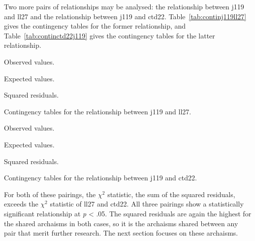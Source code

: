 Two more pairs of relationships may be analysed: the relationship between \gls{j119} and \gls{ll27} and the relationship between \gls{j119} and \gls{ctd22}. Table~\ref{tab:continj119ll27} gives the contingency tables for the former relationship, and Table~\ref{tab:continctd22j119} gives the contingency tables for the latter relationship. 
\begin{table}[h]
  \centering
  \begin{subtable}[b]{0.5\linewidth}
    \centering
    \caption{Observed values.}
    \label{stab:obsj119ll27}
  \end{subtable}%
  \begin{subtable}[b]{0.5\linewidth}
    \centering
    \caption{Expected values.}
    \label{stab:expj119ll27}
  \end{subtable}
  \begin{subtable}[b]{0.5\linewidth}
    \centering
    \caption{Squared residuals.}
    \label{stab:sqresj119ll27}
  \end{subtable}
  \caption{Contingency tables for the relationship between \acrshort{j119} and \acrshort{ll27}.}
  \label{tab:continj119ll27}
\end{table}

\begin{table}[h]
  \centering
  \begin{subtable}[b]{0.5\linewidth}
    \centering
    \caption{Observed values.}
    \label{stab:obsctd22j119}
  \end{subtable}%
  \begin{subtable}[b]{0.5\linewidth}
    \centering
    \caption{Expected values.}
    \label{stab:expctd22j119}
  \end{subtable}
  \begin{subtable}[b]{0.5\linewidth}
    \centering
    \caption{Squared residuals.}
    \label{stab:sqresctd22j119}
  \end{subtable}
  \caption{Contingency tables for the relationship between \acrshort{j119} and \acrshort{ctd22}.}
  \label{tab:continctd22j119}
  \end{table}
For both of these pairings, the \(\chi^2\) statistic, \ie the sum of the squared residuals, exceeds the \(\chi^2\) statistic of \gls{ll27} and \gls{ctd22}. All three pairings show a statistically significant relationship at \textit{p} < .05. The squared residuals are again the highest for the shared archaisms in both cases, so it is the archaisms shared between any pair that merit further research. The next section  focuses on these archaisms.

